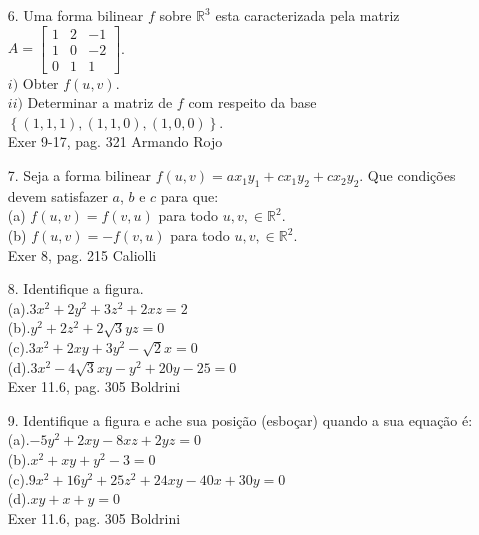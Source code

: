 \begin{itemize}
	\item[6.] Uma forma bilinear $f$ sobre $\mathbb{R}^{3}$ esta caracterizada pela matriz $A=\begin{bmatrix}
	1    & 2 & -1  \\
	1    & 0 & -2 \\
	0    & 1 & 1 
	\end{bmatrix}$.\\
	 $i)$ Obter $f(u,v)$.\\
	  $ii)$ Determinar a matriz de $f$ com respeito da base $ \left\lbrace (1,1,1), (1,1,0), (1,0,0) \right\rbrace $.\\ 
 Exer 9-17, pag. 321 Armando Rojo		
\end{itemize}
\begin{itemize}
	\item[7.] Seja a forma bilinear $f(u,v)=ax_{1}y_{1}+cx_{1}y_{2}+cx_{2}y_{2}$. Que condições devem satisfazer $a$, $b$ e $c$ para que:\\
	(a) $f(u,v)=f(v,u)$ para todo $u,v, \in \mathbb{R}^{2}$.\\
	(b) $f(u,v)=-f(v,u)$ para todo $u,v, \in \mathbb{R}^{2}$. \\
 Exer 8, pag. 215 Caliolli		
\end{itemize}
\begin{itemize}
	\item[8.] Identifique a figura.\\
	(a).\quad $3x^{2}+2y^{2}+3z^{2}+2xz=2$\\
	(b).\quad $y^{2}+2z^{2}+2\sqrt{3}yz=0$\\
	(c).\quad $3x^{2}+2xy+3y^{2}-\sqrt{2}x=0$\\
	(d).\quad $3x^{2}-4\sqrt{3}xy-y^{2}+20y-25=0$ \\
	 Exer 11.6, pag. 305 Boldrini
\end{itemize}
\begin{itemize}
	\item[9.] Identifique a figura e ache sua posição (esboçar) quando a sua equação é:\\
	 (a).\quad $-5y^{2}+2xy-8xz+2yz=0$\\
	 (b).\quad$x^{2}+xy+y^{2}-3=0$\\
	 (c).\quad$9x^{2}+16y^{2}+25z^{2}+24xy-40x+30y=0$\\
	 (d).\quad$xy+x+y=0$\\
	 Exer 11.6, pag. 305 Boldrini
\end{itemize}
